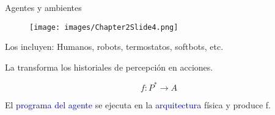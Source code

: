\begin{frame}{Agentes y ambientes}

\begin{figure}
    \centering
    \texttt{[image: images/Chapter2Slide4.png]}
\end{figure}

Los 
 incluyen: Humanos, robots, termostatos, softbots, etc.

La 
 transforma los historiales de percepción en acciones.

\[
 f: P^* \rightarrow A
\]

El 
\textcolor{darkblue}{programa del agente} se ejecuta en la \textcolor{darkblue}{arquitectura} física y produce f.

\end{frame}
